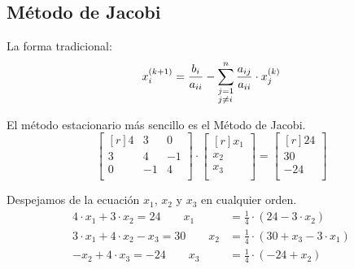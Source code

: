 \documentclass[../main.tex]{subfiles}
\begin{document}
    \subsection{Método de Jacobi}
        La forma tradicional:
        \begin{equation}
            x_{i}^{(k+1)} = \frac{b_i}{a_{ii}} - 
            \sum_{\begin{subarray}{l}
                        j= 1 \\
                        j \neq i
                    \end{subarray}
                }^{n} \frac{a_{ij}}{a_{ii}} \cdot x_j^{(k)}
        \end{equation}

        El método estacionario más sencillo es el Método de Jacobi. 
        \begin{equation}
            \begin{bmatrix*}[r]
                4 & 3 & 0 \\
                3 & 4 & -1 \\
                0 & -1 & 4 \\
            \end{bmatrix*}
            \cdot
            \begin{bmatrix*}[r]
                x_1 \\
                x_2 \\
                x_3 \\
            \end{bmatrix*}
            =
            \begin{bmatrix*}[r]
                24 \\
                30 \\
                -24 \\
            \end{bmatrix*}   
        \end{equation}
    
        Despejamos de la ecuación $x_1$, $x_2$ y $x_3$ en cualquier orden.
        \begin{equation}
            \begin{split}
                4 \cdot x_1 + 3 \cdot x_2 = 24 \quad \quad x_1 &= \frac{1}{4} \cdot (24 - 3 \cdot x_2)\\
                3 \cdot x_1 + 4 \cdot x_2 - x_3 = 30 \quad \quad x_2 &= \frac{1}{4} \cdot (30 + x_3 - 3 \cdot x_1)\\
                -x_2 + 4 \cdot x_3 = -24 \quad \quad x_3 &= \frac{1}{4} \cdot (-24 + x_2)\\
            \end{split}
            \label{eq:sist_despeje}
        \end{equation}
\end{document}
